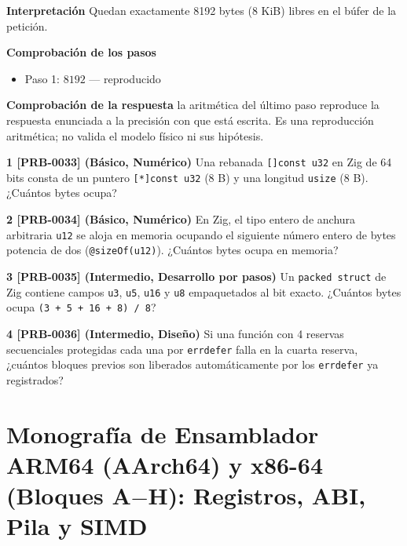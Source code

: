 \documentclass{book}
\begin{document}
\begin{tcolorbox}[title={Problema resuelto}, studiumworked, breakable]
\noindent\textbf{Interpretación}
Quedan exactamente 8192 bytes (8 KiB) libres en el búfer de la petición.

\noindent\textbf{Comprobación de los pasos}
\begin{itemize}
\item Paso 1: $8192$ — reproducido
\end{itemize}

\noindent\textbf{Comprobación de la respuesta} la aritmética del último paso reproduce la respuesta enunciada a la precisión con que está escrita. Es una reproducción aritmética; no valida el modelo físico ni sus hipótesis.
\end{tcolorbox}

\begin{tcolorbox}[title={Ejercicios}, studiumworked, breakable]

\noindent\textbf{1 [PRB-0033] (Básico, Numérico)}
Una rebanada \texttt{[]const u32} en Zig de 64 bits consta de un puntero \texttt{[*]const u32} (8 B) y una longitud \texttt{usize} (8 B). ¿Cuántos bytes ocupa?

\noindent\textbf{2 [PRB-0034] (Básico, Numérico)}
En Zig, el tipo entero de anchura arbitraria \texttt{u12} se aloja en memoria ocupando el siguiente número entero de bytes potencia de dos (\texttt{@sizeOf(u12)}). ¿Cuántos bytes ocupa en memoria?

\noindent\textbf{3 [PRB-0035] (Intermedio, Desarrollo por pasos)}
Un \texttt{packed struct} de Zig contiene campos \texttt{u3}, \texttt{u5}, \texttt{u16} y \texttt{u8} empaquetados al bit exacto. ¿Cuántos bytes ocupa \texttt{(3 + 5 + 16 + 8) / 8}?

\noindent\textbf{4 [PRB-0036] (Intermedio, Diseño)}
Si una función con 4 reservas secuenciales protegidas cada una por \texttt{errdefer} falla en la cuarta reserva, ¿cuántos bloques previos son liberados automáticamente por los \texttt{errdefer} ya registrados?
\end{tcolorbox}

\chapter{Monografía de Ensamblador ARM64 (AArch64) y x86-64 (Bloques A\(-\)H): Registros, ABI, Pila y SIMD}
\label{chap:cap07-monografia-ensamblador-arm64-x86-64-abi-simd}
\end{document}
